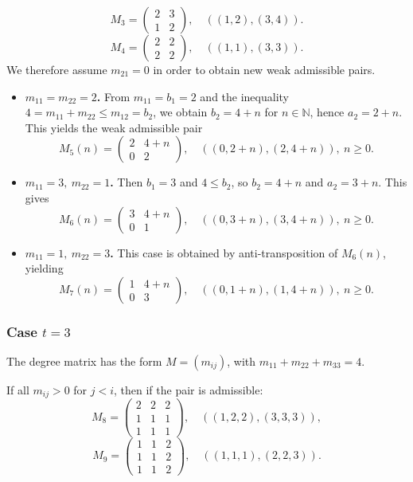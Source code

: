 \documentclass[12pt,reqno]{amsart}
\theoremstyle{plain}
\theoremstyle{definition}
\theoremstyle{remark}
\theoremstyle{definition}
\begin{document}
    $$ M_{3}=\left( \begin{array}{cc}
2 & 3\\
1 & 2
\end{array}
    \right)  ,\quad ((1,2),(3,4)).$$
        $$ M_{4}=\left( \begin{array}{cc}
2 & 2\\
2 & 2
\end{array}
    \right)  ,\quad ((1,1),(3,3)). $$
We therefore assume $m_{21}=0$ in order to obtain new weak admissible pairs.

\begin{itemize}
\item \textbf{$m_{11}=m_{22}=2$.}  
From $m_{11}=b_1=2$ and the inequality $4=m_{11}+m_{22}\leq m_{12}=b_2$, we obtain $b_2=4+n$ for $n\in\mathds{N}$, hence $a_2=2+n$. This yields the weak admissible pair
\[
M_5(n)=\begin{pmatrix}2&4+n\\0&2\end{pmatrix},\quad ((0,2+n),(2,4+n)),\ n\geq 0.
\]

\item \textbf{$m_{11}=3,\ m_{22}=1$.}  
Then $b_1=3$ and $4\leq b_2$, so $b_2=4+n$ and $a_2=3+n$. This gives
\[
M_6(n)=\begin{pmatrix}3&4+n\\0&1\end{pmatrix},\quad ((0,3+n),(3,4+n)),\ n\geq 0.
\]

\item \textbf{$m_{11}=1,\ m_{22}=3$.}  
This case is obtained by anti-transposition of $M_6(n)$, yielding
\[
M_7(n)=\begin{pmatrix}1&4+n\\0&3\end{pmatrix},\quad ((0,1+n),(1,4+n)),\ n\geq 0.
\]
\end{itemize}

\subsubsection{\textbf{Case $t=3$}}

The degree matrix has the form $M=(m_{ij})$, with $m_{11}+m_{22}+m_{33}=4.$

If all $m_{ij}>0$ for $j<i$, then if the pair is admissible:
\[
M_{8}=\begin{pmatrix}2&2&2\\1&1&1\\1&1&1\end{pmatrix},
\quad ((1,2,2),(3,3,3)),
\]
\[
M_{9}=\begin{pmatrix}1&1&2\\1&1&2\\1&1&2\end{pmatrix},
\quad ((1,1,1),(2,2,3)).
\]
\end{document}
